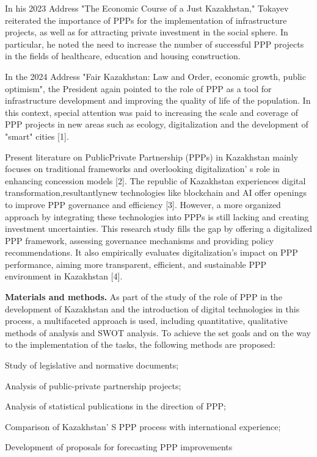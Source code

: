 In his 2023 Address "The Economic Course of a Just Kazakhstan," Tokayev
reiterated the importance of PPPs for the implementation of
infrastructure projects, as well as for attracting private investment in
the social sphere. In particular, he noted the need to increase the
number of successful PPP projects in the fields of healthcare, education
and housing construction.

In the 2024 Address "Fair Kazakhstan: Law and Order, economic growth,
public optimism", the President again pointed to the role of PPP as a
tool for infrastructure development and improving the quality of life of
the population. In this context, special attention was paid to
increasing the scale and coverage of PPP projects in new areas such as
ecology, digitalization and the development of "smart" cities {[}1{]}.

Present literature on PublicPrivate Partnership (PPPs) in Kazakhstan
mainly focuses on traditional frameworks and overlooking
digitalization' s role in enhancing concession models
{[}2{]}. The republic of Kazakhstan experiences digital
transformation,resultantlynew technologies like blockchain and AI offer
openings to improve PPP governance and efficiency {[}3{]}. However, a
more organized approach by integrating these technologies into PPPs is
still lacking and creating investment uncertainties. This research study
fills the gap by offering a digitalized PPP framework, assessing
governance mechanisms and providing policy recommendations. It also
empirically evaluates digitalization's impact on PPP performance, aiming
more transparent, efficient, and sustainable PPP environment in
Kazakhstan {[}4{]}.

{\bfseries Materials and methods.} As part of the study of the role of PPP
in the development of Kazakhstan and the introduction of digital
technologies in this process, a multifaceted approach is used, including
quantitative, qualitative methods of analysis and SWOT analysis. To
achieve the set goals and on the way to the implementation of the tasks,
the following methods are proposed:

Study of legislative and normative documents;

Analysis of public-private partnership projects;

Analysis of statistical publications in the direction of PPP;

Comparison of Kazakhstan' S PPP process with
international experience;

Development of proposals for forecasting PPP improvements

